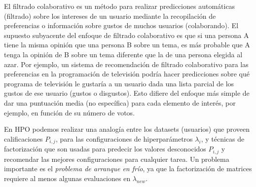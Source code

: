 
El filtrado colaborativo es un método para realizar predicciones automáticas (filtrado) sobre los intereses de un usuario mediante la recopilación de preferencias o información sobre gustos de muchos usuarios (colaborando). El supuesto subyacente del enfoque de filtrado colaborativo es que si una persona A tiene la misma opinión que una persona B sobre un tema, es más probable que A tenga la opinión de B sobre un tema diferente que la de una persona elegida al azar. Por ejemplo, un sistema de recomendación de filtrado colaborativo para las preferencias en la programación de televisión podría hacer predicciones sobre qué programa de televisión le gustaría a un usuario dada una lista parcial de los gustos de ese usuario (gustos o disgustos). Esto difiere del enfoque más simple de dar una puntuación media (no específica) para cada elemento de interés, por ejemplo, en función de su número de votos.

En HPO podemos realizar una analogía entre los datasets (usuarios) que proveen calificaciones $P_{i,j}$, para las configuraciones de hiperparámetros $\lambda_i$, y técnicas de factorización que son usadas para predecir los valores desconocidos $P_{i,j}$ y recomendar las mejores configuraciones para cualquier tarea. Un problema importante es el \textit{problema de arranque en frío}, ya que la factorización de matrices requiere al menos algunas evaluaciones en $\lambda_{new}$.

